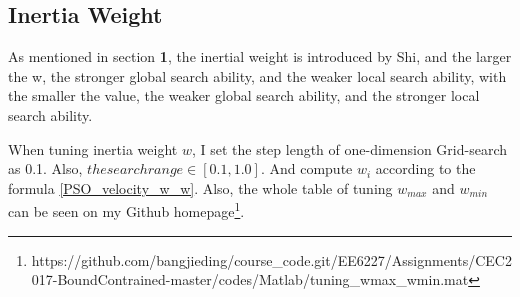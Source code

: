 \documentclass[letterpaper,12pt]{article}
\begin{document}
\subsection{Inertia Weight}
\par As mentioned in section \textbf{1}, the inertial weight is introduced by Shi\cite{shi}, and the larger the w, the stronger global search ability, and the weaker local search ability, with the smaller the value, the weaker global search ability, and the stronger local search ability. 
\par When tuning inertia weight $w$, I set the step length of one-dimension Grid-search as 0.1. Also, $the search range \in[0.1,1.0]$. And compute $w_i$ according to the formula \ref{PSO_velocity_w_w}. Also, the whole table of tuning $w_{max}$ and $w_{min}$ can be seen on my Github homepage\footnote{https://github.com/bangjieding/course\_code.git/EE6227/Assignments/CEC2017-BoundContrained-master/codes/Matlab/tuning\_wmax\_wmin.mat}.
\end{document}
